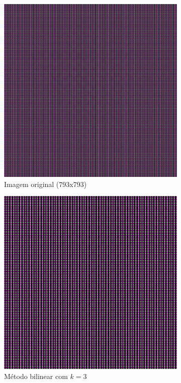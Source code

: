 \documentclass[leqno]{article}
\begin{document}
\begin{figure}[H]
    \centering
    \begin{subfigure}{.33\textwidth}
      \centering
      \includegraphics[width=.7\linewidth]{../images/func_1_color.png}
      \caption{Imagem original  (793x793) }
      \label{fig:sub1}
    \end{subfigure}%
    \begin{subfigure}{.33\textwidth}
      \centering
      \includegraphics[width=.7\linewidth]{../images/func_1_color_bil.png}
      \caption{Método bilinear com $k = 3$}
      \label{fig:sub2}
    \end{subfigure}
    \begin{subfigure}{.33\textwidth}
        \centering

\end{subfigure}
\end{figure}
\end{document}
